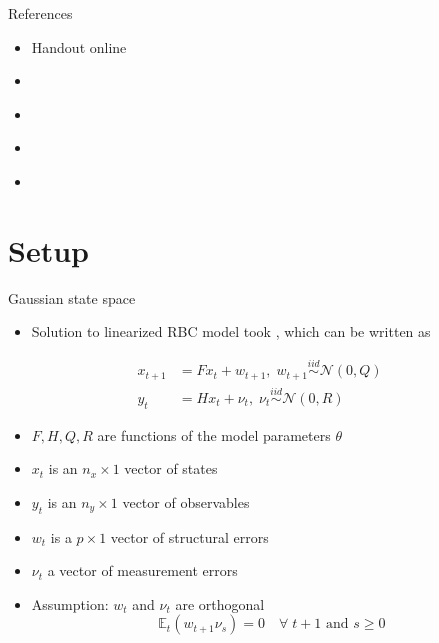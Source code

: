 \documentclass[handout,usepdftitle=false,xcolor=dvipsnames,aspectratio=169]{beamer}
\begin{document}
\begin{frame}{References}
  \begin{itemize}
    \item Handout online\vspace{0.2cm}
    \item \textcite[][Chapter 2.5]{LjungqvistSargent2012}\vspace{0.2cm}
    \item \textcite[][Chapter 13]{Hamilton1994}\vspace{0.2cm}
    \item \textcite{DurbinKoopman2012}\vspace{0.2cm}
    \item \textcite[][Chapter 6]{Canova2007Book}
  \end{itemize}

\end{frame}


\section{Setup}
\begin{frame}{Gaussian state space}
  \begin{itemize}
    \item Solution to linearized RBC model took , which can be written as
  \end{itemize}
  \begin{align}
    x_{t + 1} & = F x_t + w_{t + 1},\; w_{t + 1}\mathop  \sim \limits^{iid} \mathcal{N}\left(0,Q\right) \\
    y_t       & = Hx_t + \nu_t, \; \nu _t\mathop  \sim \limits^{iid} \mathcal{N}\left(0,R \right)
  \end{align}

  \begin{itemize}
    \item $F,H,Q,R$ are functions of the model parameters $\theta$
    \item $x_t$ is an $n_x \times 1$ vector of states\vspace{0.2cm}
    \item $y_t$ is an $n_y \times 1$ vector of observables\vspace{0.2cm}
    \item $w_t$ is a $p \times 1$ vector of structural errors\vspace{0.2cm}
    \item $\nu_t$ a vector of measurement errors\vspace{0.2cm}
    \item Assumption: $w_t$ and $\nu_t$ are orthogonal
          \begin{equation*}
            \mathbb{E}_t\left( w_{t + 1}\nu_s \right) = 0 \quad \forall\; t+1 \text{ and } s\geq0
          \end{equation*}
  \end{itemize}
\end{frame}
\end{document}
